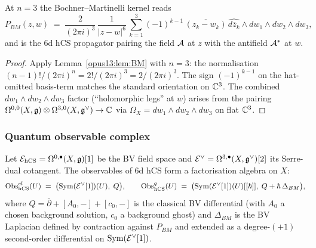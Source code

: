 \begin{corollary}\ClaimStatusCorollary
\label{opus13:cor:BM-n3}
At $n = 3$ the Bochner--Martinelli kernel reads
\begin{equation}
  P_{BM}(z, w)
  \;=\; \frac{2}{(2\pi i)^3}\,\frac{1}{|z-w|^6}\,\sum_{k=1}^{3}
  (-1)^{k-1}\,\overline{(z_k - w_k)}\,\widehat{d\overline{z}_k}\wedge
  dw_1\wedge dw_2\wedge dw_3,
  \label{opus13:eq:PBM}
\end{equation}
and is the 6d hCS propagator pairing the field
$\mathcal{A}$ at $z$ with the antifield $\mathcal{A}^*$ at $w$.
\end{corollary}

\begin{proof}
Apply Lemma~\ref{opus13:lem:BM} with $n = 3$: the normalisation
$(n-1)!/(2\pi i)^n = 2!/(2\pi i)^3 = 2/(2\pi i)^3$. The sign
$(-1)^{k-1}$ on the hat-omitted basis-term matches the standard
orientation on $\mathbb{C}^3$. The combined $dw_1\wedge dw_2\wedge dw_3$
factor (``holomorphic legs'' at $w$) arises from the pairing
$\Omega^{0,0}(X,\mathfrak{g}) \otimes \Omega^{3,0}(X,\mathfrak{g}^\vee) \to \mathbb{C}$ via
$\Omega_X = dw_1\wedge dw_2\wedge dw_3$ on flat $\mathbb{C}^3$.
\end{proof}

\subsubsection{Quantum observable complex}

\begin{theorem}\ClaimStatusTheorem
\label{opus13:thm:obs-complex}
Let $\mathcal{E}_{\mathrm{hCS}} = \Omega^{0,\bullet}(X,\mathfrak{g})[1]$ be the BV field space
and $\mathcal{E}^\vee = \Omega^{3,\bullet}(X,\mathfrak{g}^\vee)[2]$ its Serre-dual
cotangent. The observables of 6d hCS form a factorisation algebra on
$X$:
\begin{equation}
  \mathrm{Obs}_{\mathrm{hCS}}^{cl}(U) \;=\; \bigl(\mathrm{Sym}(\mathcal{E}^\vee[1])(U),\;
  Q\bigr),
  \qquad
  \mathrm{Obs}_{\mathrm{hCS}}^{q}(U) \;=\; \bigl(\mathrm{Sym}(\mathcal{E}^\vee[1])(U)[[\hbar]],\;
  Q + \hbar\,\Delta_{BM}\bigr),
  \label{opus13:eq:obs}
\end{equation}
where $Q = \bar\partial + [A_0,-] + [c_0,-]$ is the classical BV
differential (with $A_0$ a chosen background solution, $c_0$ a
background ghost) and $\Delta_{BM}$ is the BV Laplacian defined by
contraction against $P_{BM}$ and extended as a degree-$(+1)$
second-order differential on $\mathrm{Sym}(\mathcal{E}^\vee[1])$.
\end{theorem}

